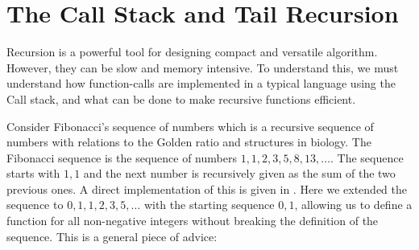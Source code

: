 \documentclass[fsharpNotes.tex]{subfiles}
\begin{document}

\section{The Call Stack and Tail Recursion}
\label{sec:callStack}
Recursion is a powerful tool for designing compact and versatile algorithm. However, they can be slow and memory intensive. To understand this, we must understand how function-calls are implemented in a typical language using the Call stack, and what can be done to make recursive functions efficient.


Consider Fibonacci's sequence of numbers which is a recursive sequence of numbers with relations to the Golden ratio and structures in biology. The Fibonacci sequence is the sequence of numbers $1, 1, 2, 3, 5, 8, 13, \ldots$. The sequence starts with $1, 1$ and the next number is recursively given as the sum of the two previous ones. A direct implementation of this is given in .
%
%
Here we extended the sequence to $0, 1, 1, 2, 3, 5, \ldots$ with the starting sequence $0, 1$, allowing us to define a function for all non-negative integers without breaking the definition of the sequence. This is a general piece of advice:  
\end{document}
